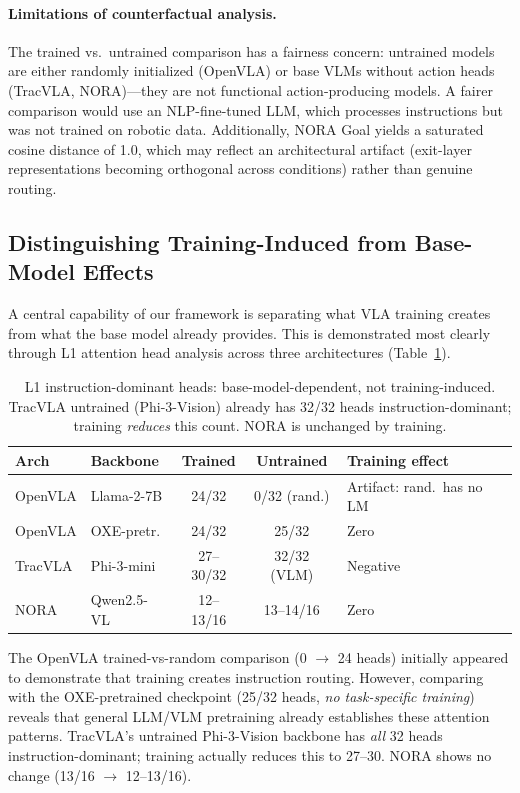 \documentclass[letterpaper]{article}
\begin{document}
\paragraph{Limitations of counterfactual analysis.}
The trained vs.\ untrained comparison has a fairness concern: untrained models are either randomly initialized (OpenVLA) or base VLMs without action heads (TracVLA, NORA)---they are not functional action-producing models.
A fairer comparison would use an NLP-fine-tuned LLM, which processes instructions but was not trained on robotic data.
Additionally, NORA Goal yields a saturated cosine distance of 1.0, which may reflect an architectural artifact (exit-layer representations becoming orthogonal across conditions) rather than genuine routing.

\subsection{Distinguishing Training-Induced from Base-Model Effects}
\label{sec:d090}

A central capability of our framework is separating what VLA training creates from what the base model already provides.
This is demonstrated most clearly through L1 attention head analysis across three architectures (Table~\ref{tab:d090}).

\begin{table}[t]
\centering
\caption{L1 instruction-dominant heads: base-model-dependent, not training-induced. TracVLA untrained (Phi-3-Vision) already has 32/32 heads instruction-dominant; training \emph{reduces} this count. NORA is unchanged by training.}
\label{tab:d090}
\small
\begin{tabular}{llccl}
\toprule
\textbf{Arch} & \textbf{Backbone} & \textbf{Trained} & \textbf{Untrained} & \textbf{Training effect} \\
\midrule
OpenVLA & Llama-2-7B & 24/32 & 0/32 (rand.) & Artifact: rand.\ has no LM \\
OpenVLA & OXE-pretr. & 24/32 & 25/32 & Zero \\
TracVLA & Phi-3-mini & 27--30/32 & 32/32 (VLM) & Negative \\
NORA & Qwen2.5-VL & 12--13/16 & 13--14/16 & Zero \\
\bottomrule
\end{tabular}
\end{table}

The OpenVLA trained-vs-random comparison (0 $\rightarrow$ 24 heads) initially appeared to demonstrate that training creates instruction routing.
However, comparing with the OXE-pretrained checkpoint (25/32 heads, \emph{no task-specific training}) reveals that general LLM/VLM pretraining already establishes these attention patterns.
TracVLA's untrained Phi-3-Vision backbone has \emph{all} 32 heads instruction-dominant; training actually reduces this to 27--30.
NORA shows no change (13/16 $\rightarrow$ 12--13/16).
\end{document}
